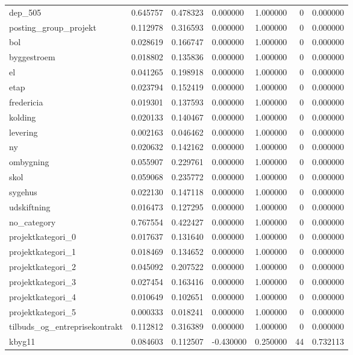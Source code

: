 \begin{landscape}
\begin{longtable}[h!]{lrrllrr}
dep_505 & 0.645757 & 0.478323 & 0.000000 & 1.000000 & 0 & 0.000000 \\
posting_group_projekt & 0.112978 & 0.316593 & 0.000000 & 1.000000 & 0 & 0.000000 \\
bol & 0.028619 & 0.166747 & 0.000000 & 1.000000 & 0 & 0.000000 \\
byggestroem & 0.018802 & 0.135836 & 0.000000 & 1.000000 & 0 & 0.000000 \\
el & 0.041265 & 0.198918 & 0.000000 & 1.000000 & 0 & 0.000000 \\
etap & 0.023794 & 0.152419 & 0.000000 & 1.000000 & 0 & 0.000000 \\
fredericia & 0.019301 & 0.137593 & 0.000000 & 1.000000 & 0 & 0.000000 \\
kolding & 0.020133 & 0.140467 & 0.000000 & 1.000000 & 0 & 0.000000 \\
levering & 0.002163 & 0.046462 & 0.000000 & 1.000000 & 0 & 0.000000 \\
ny & 0.020632 & 0.142162 & 0.000000 & 1.000000 & 0 & 0.000000 \\
ombygning & 0.055907 & 0.229761 & 0.000000 & 1.000000 & 0 & 0.000000 \\
skol & 0.059068 & 0.235772 & 0.000000 & 1.000000 & 0 & 0.000000 \\
sygehus & 0.022130 & 0.147118 & 0.000000 & 1.000000 & 0 & 0.000000 \\
udskiftning & 0.016473 & 0.127295 & 0.000000 & 1.000000 & 0 & 0.000000 \\
no_category & 0.767554 & 0.422427 & 0.000000 & 1.000000 & 0 & 0.000000 \\
projektkategori_0 & 0.017637 & 0.131640 & 0.000000 & 1.000000 & 0 & 0.000000 \\
projektkategori_1 & 0.018469 & 0.134652 & 0.000000 & 1.000000 & 0 & 0.000000 \\
projektkategori_2 & 0.045092 & 0.207522 & 0.000000 & 1.000000 & 0 & 0.000000 \\
projektkategori_3 & 0.027454 & 0.163416 & 0.000000 & 1.000000 & 0 & 0.000000 \\
projektkategori_4 & 0.010649 & 0.102651 & 0.000000 & 1.000000 & 0 & 0.000000 \\
projektkategori_5 & 0.000333 & 0.018241 & 0.000000 & 1.000000 & 0 & 0.000000 \\
tilbuds_og_entreprisekontrakt & 0.112812 & 0.316389 & 0.000000 & 1.000000 & 0 & 0.000000 \\
kbyg11 & 0.084603 & 0.112507 & -0.430000 & 0.250000 & 44 & 0.732113 \\

\end{longtable}
\end{landscape}
